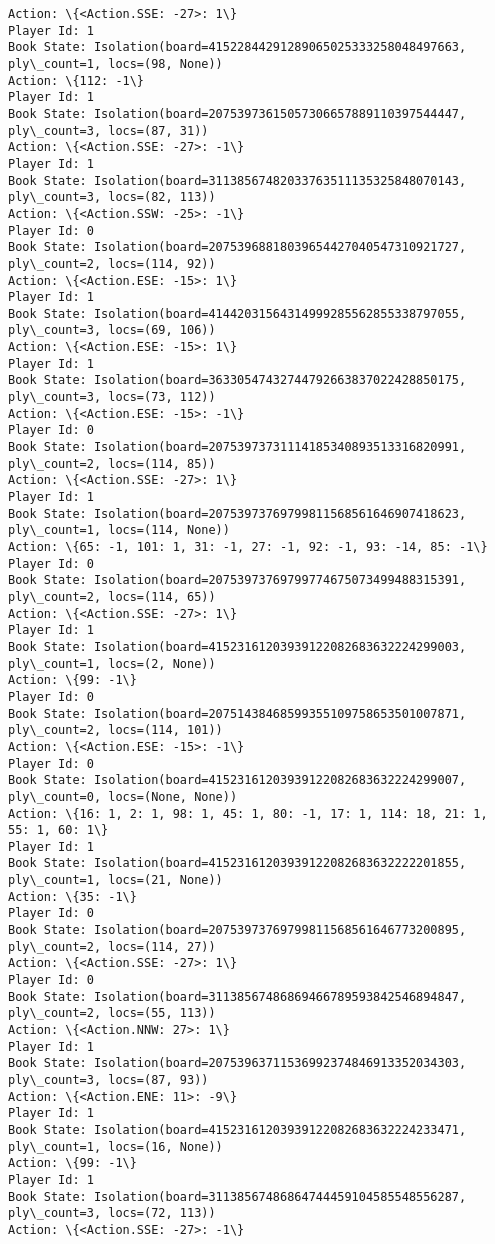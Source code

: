 \documentclass[11pt]{article}
\begin{document}
\begin{Verbatim}[commandchars=\\\{\}]
Action: \{<Action.SSE: -27>: 1\}
Player Id: 1
Book State: Isolation(board=41522844291289065025333258048497663, ply\_count=1, locs=(98, None))
Action: \{112: -1\}
Player Id: 1
Book State: Isolation(board=20753973615057306657889110397544447, ply\_count=3, locs=(87, 31))
Action: \{<Action.SSE: -27>: -1\}
Player Id: 1
Book State: Isolation(board=31138567482033763511135325848070143, ply\_count=3, locs=(82, 113))
Action: \{<Action.SSW: -25>: -1\}
Player Id: 0
Book State: Isolation(board=20753968818039654427040547310921727, ply\_count=2, locs=(114, 92))
Action: \{<Action.ESE: -15>: 1\}
Player Id: 1
Book State: Isolation(board=41442031564314999285562855338797055, ply\_count=3, locs=(69, 106))
Action: \{<Action.ESE: -15>: 1\}
Player Id: 1
Book State: Isolation(board=36330547432744792663837022428850175, ply\_count=3, locs=(73, 112))
Action: \{<Action.ESE: -15>: -1\}
Player Id: 0
Book State: Isolation(board=20753973731114185340893513316820991, ply\_count=2, locs=(114, 85))
Action: \{<Action.SSE: -27>: 1\}
Player Id: 1
Book State: Isolation(board=20753973769799811568561646907418623, ply\_count=1, locs=(114, None))
Action: \{65: -1, 101: 1, 31: -1, 27: -1, 92: -1, 93: -14, 85: -1\}
Player Id: 0
Book State: Isolation(board=20753973769799774675073499488315391, ply\_count=2, locs=(114, 65))
Action: \{<Action.SSE: -27>: 1\}
Player Id: 1
Book State: Isolation(board=41523161203939122082683632224299003, ply\_count=1, locs=(2, None))
Action: \{99: -1\}
Player Id: 0
Book State: Isolation(board=20751438468599355109758653501007871, ply\_count=2, locs=(114, 101))
Action: \{<Action.ESE: -15>: -1\}
Player Id: 0
Book State: Isolation(board=41523161203939122082683632224299007, ply\_count=0, locs=(None, None))
Action: \{16: 1, 2: 1, 98: 1, 45: 1, 80: -1, 17: 1, 114: 18, 21: 1, 55: 1, 60: 1\}
Player Id: 1
Book State: Isolation(board=41523161203939122082683632222201855, ply\_count=1, locs=(21, None))
Action: \{35: -1\}
Player Id: 0
Book State: Isolation(board=20753973769799811568561646773200895, ply\_count=2, locs=(114, 27))
Action: \{<Action.SSE: -27>: 1\}
Player Id: 0
Book State: Isolation(board=31138567486869466789593842546894847, ply\_count=2, locs=(55, 113))
Action: \{<Action.NNW: 27>: 1\}
Player Id: 1
Book State: Isolation(board=20753963711536992374846913352034303, ply\_count=3, locs=(87, 93))
Action: \{<Action.ENE: 11>: -9\}
Player Id: 1
Book State: Isolation(board=41523161203939122082683632224233471, ply\_count=1, locs=(16, None))
Action: \{99: -1\}
Player Id: 1
Book State: Isolation(board=31138567486864744459104585548556287, ply\_count=3, locs=(72, 113))
Action: \{<Action.SSE: -27>: -1\}

\end{Verbatim}
\end{document}
